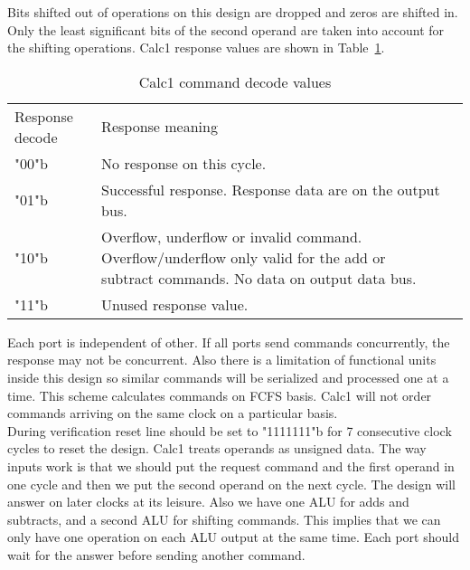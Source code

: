 \documentclass[a4paper, 11pt]{article}
\begin{document}
Bits shifted out of operations on this design are dropped and zeros are shifted
in. Only the least significant bits of the second operand are taken into
account for the shifting operations. Calc1 response values are shown in
Table~\ref{table:2}.
\begin{table}[H]
    \centering
    \begin{tabular}{lp{12cm}l}
        \toprule
        Response decode & Response meaning\\
        \cmidrule(r){1-1}\cmidrule(lr){2-2}
        "00"b & No response on this cycle. \\
        "01"b & Successful response. Response data are on the output bus.\\
        "10"b & Overflow, underflow or invalid command. Overflow/underflow only
        valid for the add or subtract commands. No data on output data bus.\\ 
        "11"b & Unused response value. \\
        \bottomrule
    \end{tabular}
    \caption{Calc1 command decode values}
    \label{table:2}
\end{table}
Each port is independent of other. If all ports send commands concurrently, the
response may not be concurrent. Also there is a limitation of functional units
inside this design so similar commands will be serialized and processed one at
a time. This scheme calculates commands on FCFS basis. Calc1 will not order
commands arriving on the same clock on a particular basis. \\
During verification reset line should be set to "1111111"b for 7 consecutive 
clock cycles to reset the design. Calc1 treats operands as unsigned data.
The way inputs work is that we should put the request command and the first
operand in one cycle and then we put the second operand on the next cycle. The
design will answer on later clocks at its leisure. Also we have one ALU for
adds and subtracts, and a second ALU for shifting commands. This implies that
we can only have one operation on each ALU output at the same time. Each port 
should wait for the answer before sending another command.
\end{document}
